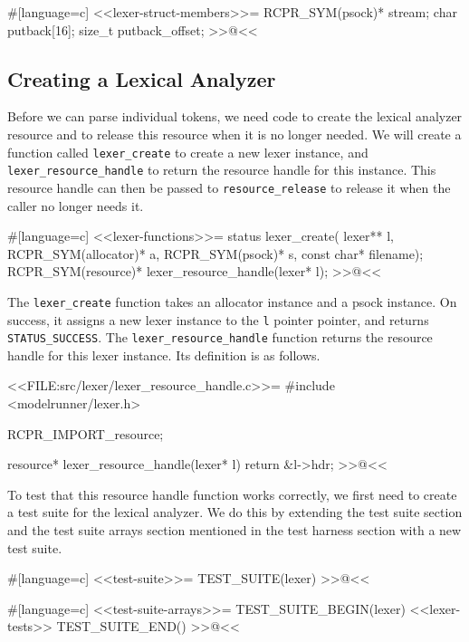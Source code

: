 #[language=c]
<<lexer-struct-members>>=
    RCPR_SYM(psock)* stream;
    char putback[16];
    size_t putback_offset;
>>@<<

\subsection{Creating a Lexical Analyzer}

Before we can parse individual tokens, we need code to create the lexical
analyzer resource and to release this resource when it is no longer needed. We
will create a function called \verb/lexer_create/ to create a new lexer
instance, and \verb/lexer_resource_handle/ to return the resource handle for
this instance.  This resource handle can then be passed to
\verb/resource_release/ to release it when the caller no longer needs it.

#[language=c]
<<lexer-functions>>=
status lexer_create(
    lexer** l, RCPR_SYM(allocator)* a, RCPR_SYM(psock)* s,
    const char* filename);
RCPR_SYM(resource)* lexer_resource_handle(lexer* l);
>>@<<

The \verb/lexer_create/ function takes an allocator instance and a psock
instance. On success, it assigns a new lexer instance to the \verb/l/ pointer
pointer, and returns \verb/STATUS_SUCCESS/.  The \verb/lexer_resource_handle/
function returns the resource handle for this lexer instance.  Its definition is
as follows.

<<FILE:src/lexer/lexer_resource_handle.c>>=
#include <modelrunner/lexer.h>

RCPR_IMPORT_resource;

resource* lexer_resource_handle(lexer* l)
{
    return &l->hdr;
}
>>@<<

To test that this resource handle function works correctly, we first need to
create a test suite for the lexical analyzer.  We do this by extending the test
suite section and the test suite arrays section mentioned in the test harness
section with a new test suite.

#[language=c]
<<test-suite>>=
TEST_SUITE(lexer)
>>@<<

#[language=c]
<<test-suite-arrays>>=
TEST_SUITE_BEGIN(lexer)
<<lexer-tests>>
TEST_SUITE_END()
>>@<<

